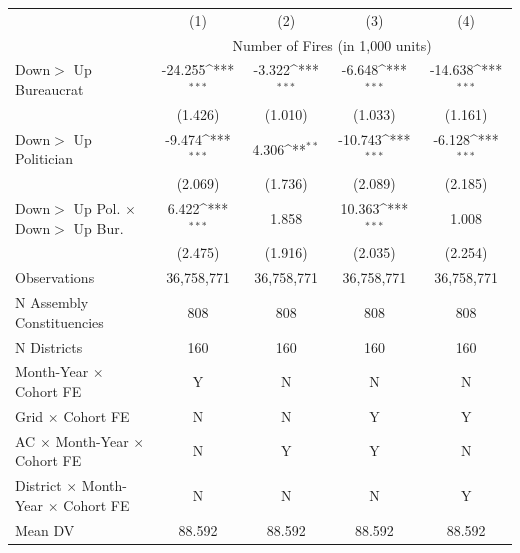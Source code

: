 {\def\sym#1{\ifmmode^{#1}\else\(^{#1}\)\fi}
\begin{tabular}{l*{4}{c}}
\hline
 & (1) & (2) & (3) & (4) \\
 & \multicolumn{4}{c}{Number of Fires (in 1,000 units)} \\ \hline

Down$>$ Up Bureaucrat&     -24.255\sym{***}&      -3.322\sym{***}&      -6.648\sym{***}&     -14.638\sym{***}\\
            &     (1.426)         &     (1.010)         &     (1.033)         &     (1.161)         \\
Down$>$ Up Politician&      -9.474\sym{***}&       4.306\sym{**} &     -10.743\sym{***}&      -6.128\sym{***}\\
            &     (2.069)         &     (1.736)         &     (2.089)         &     (2.185)         \\
Down$>$ Up Pol. $\times$ Down$>$ Up Bur.&       6.422\sym{***}&       1.858         &      10.363\sym{***}&       1.008         \\
            &     (2.475)         &     (1.916)         &     (2.035)         &     (2.254)         \\
\hline
Observations&  36,758,771         &  36,758,771         &  36,758,771         &  36,758,771         \\
N Assembly Constituencies&         808         &         808         &         808         &         808         \\
N Districts &         160         &         160         &         160         &         160         \\
Month-Year $\times$ Cohort FE&           Y         &           N         &           N         &           N         \\
Grid $\times$ Cohort FE&           N         &           N         &           Y         &           Y         \\
AC $\times$ Month-Year $\times$ Cohort FE&           N         &           Y         &           Y         &           N         \\
District $\times$ Month-Year $\times$ Cohort FE&           N         &           N         &           N         &           Y         \\
Mean DV     &      88.592         &      88.592         &      88.592         &      88.592         \\
\hline
\end{tabular}
}
